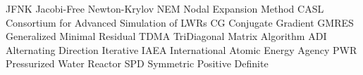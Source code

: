 \makeglossaries

    {JFNK}    {Jacobi-Free Newton-Krylov}
     {NEM}     {Nodal Expansion Method}
    {CASL}    {Consortium for Advanced Simulation of LWRs}
      {CG}      {Conjugate Gradient}
   {GMRES}   {Generalized Minimal Residual}
    {TDMA}    {TriDiagonal Matrix Algorithm}
     {ADI}     {Alternating Direction Iterative}
    {IAEA}    {International Atomic Energy Agency}
     {PWR}     {Pressurized Water Reactor}
     {SPD}     {Symmetric Positive Definite}
